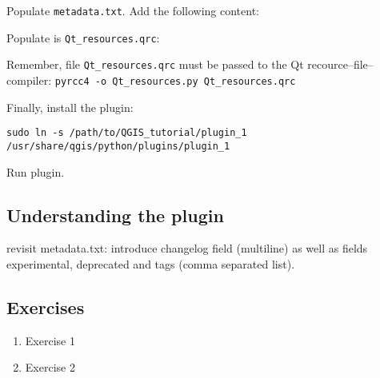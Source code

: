 \par%
Populate \lstinline{metadata.txt}. Add the following content:

\par%
Populate is \lstinline{Qt_resources.qrc}:

Remember, file \lstinline{Qt_resources.qrc} must be passed to the Qt recource--file--compiler:
\lstinline{pyrcc4 -o Qt_resources.py Qt_resources.qrc}
\par%
Finally, install the plugin:
\begin{lstlisting}
sudo ln -s /path/to/QGIS_tutorial/plugin_1 /usr/share/qgis/python/plugins/plugin_1
\end{lstlisting}
\par%
Run plugin.

\subsection{Understanding the plugin}
\label{ssect:understanding_plugin_2}
revisit metadata.txt: introduce changelog field (multiline) as well as fields experimental, deprecated and tags (comma separated list).

\subsection{Exercises}
\label{ssect:plugin_1_exercises}
\begin{enumerate}
\item Exercise 1
\item Exercise 2
\end{enumerate}
